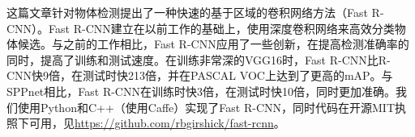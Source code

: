 \documentclass[../main]{subfile}
\begin{document}
这篇文章针对物体检测提出了一种快速的基于区域的卷积网络方法（Fast R-CNN）。Fast R-CNN建立在以前工作的基础上，使用深度卷积网络来高效分类物体候选。与之前的工作相比，Fast R-CNN应用了一些创新，在提高检测准确率的同时，提高了训练和测试速度。在训练非常深的VGG16时，Fast R-CNN比R-CNN快9倍，在测试时快213倍，并在PASCAL VOC上达到了更高的mAP。与SPPnet相比，Fast R-CNN在训练时快3倍，在测试时快10倍，同时更加准确。我们使用Python和C++（使用Caffe）实现了Fast R-CNN，同时代码在开源MIT执照下可用，见\href{https://github.com/rbgirshick/fast-rcnn}{https://github.com/rbgirshick/fast-rcnn}。
\end{document}
